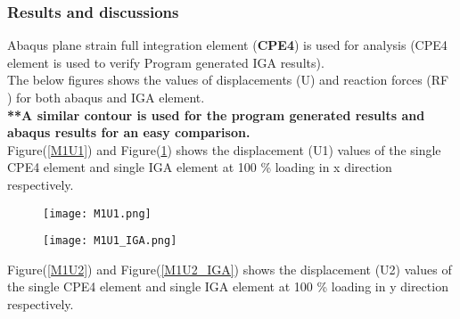 \documentclass[11pt]{article}
\begin{document}
\subsubsection{Results and discussions}
Abaqus plane strain full integration element (\textbf{CPE4}) is used for analysis (CPE4 element is used to verify Program generated IGA results). 
\\The below figures shows the values of displacements (U) and reaction forces (RF ) for both abaqus and IGA element.\\
\newpage
\textbf{**A similar contour is used for the program generated results and abaqus results for an easy comparison. }\\
Figure(\ref{M1U1}) and Figure(\ref{M1U1_IGA}) shows the displacement (U1) values of the single CPE4 element and single IGA element at 100 \% loading in x direction respectively. \\
\begin{figure}[H]
	\centering
	\begin{minipage}{.5\textwidth}
		\centering
		\texttt{[image: M1U1.png]}
		\label{M1U1}
	\end{minipage}%
	\begin{minipage}{.5\textwidth}
		\centering
		\texttt{[image: M1U1\_IGA.png]}
		\label{M1U1_IGA}
	\end{minipage}
\end{figure}
\begin{comment}
		\begin{figure}[H]
		\begin{center}
		\texttt{[image: xyz.png]} 
		\caption{\\CPE4 Element U1}\label{xyz}
		\end{center}	
		\end{figure}
		
		\begin{figure}[H]
		\begin{center}
		\texttt{[image: Figure\_1.png]} 
		\caption{\\IGA Element U1}\label{Figure_1}
		\end{center}	
		\end{figure}
\end{comment}
Figure(\ref{M1U2}) and Figure(\ref{M1U2_IGA}) shows the displacement (U2) values of the single CPE4 element and single IGA element at 100 \% loading in y direction respectively. \\
\end{document}
